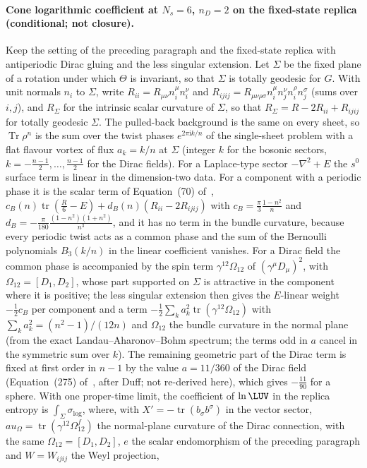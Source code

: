 \paragraph{Cone logarithmic coefficient at \(N_s=6\), \(n_D=2\) on the fixed-state replica (conditional; not closure).}
Keep the setting of the preceding paragraph and the fixed-state replica with antiperiodic Dirac gluing and the less singular extension. Let \(\Sigma\) be the fixed plane of a rotation under which \(\Theta\) is invariant, so that \(\Sigma\) is totally geodesic for \(G\). With unit normals \(n_i\) to \(\Sigma\), write \(R_{ii}=R_{\mu\nu}n^\mu_in^\nu_i\) and \(R_{ijij}=R_{\mu\nu\rho\sigma}n^\mu_in^\nu_jn^\rho_in^\sigma_j\) (sums over \(i,j\)), and \(R_\Sigma\) for the intrinsic scalar curvature of \(\Sigma\), so that \(R_\Sigma=R-2R_{ii}+R_{ijij}\) for totally geodesic \(\Sigma\). The pulled-back background is the same on every sheet, so \(\operatorname{Tr}\rho^n\) is the sum over the twist phases \(e^{2\pi\mathrm ik/n}\) of the single-sheet problem with a flat flavour vortex of flux \(a_k=k/n\) at \(\Sigma\) (integer \(k\) for the bosonic sectors, \(k=-\tfrac{n-1}2,\dots,\tfrac{n-1}2\) for the Dirac fields). For a Laplace-type sector \(-\nabla^2+E\) the \(s^0\) surface term is linear in the dimension-two data. For a component with a periodic phase it is the scalar term of Equation~(70) of~\cite{Solodukhin2011}, \(c_B(n)\operatorname{tr}(\tfrac R6-E)+d_B(n)(R_{ii}-2R_{ijij})\) with \(c_B=\tfrac\pi3\tfrac{1-n^2}n\) and \(d_B=-\tfrac\pi{180}\tfrac{(1-n^2)(1+n^2)}{n^3}\), and it has no term in the bundle curvature, because every periodic twist acts as a common phase and the sum of the Bernoulli polynomials \(B_3(k/n)\) in the linear coefficient vanishes. For a Dirac field the common phase is accompanied by the spin term \(\gamma^{12}\Omega_{12}\) of \((\gamma^\mu D_\mu)^2\), with \(\Omega_{12}=[D_1,D_2]\), whose part supported on \(\Sigma\) is attractive in the component where it is positive; the less singular extension then gives the \(E\)-linear weight \(-\tfrac12c_B\) per component and a term \(-\tfrac12\sum_ka_k^2\operatorname{tr}(\gamma^{12}\Omega_{12})\) with \(\sum_ka_k^2=(n^2-1)/(12n)\) and \(\Omega_{12}\) the bundle curvature in the normal plane (from the exact Landau--Aharonov--Bohm spectrum; the terms odd in \(a\) cancel in the symmetric sum over \(k\)). The remaining geometric part of the Dirac term is fixed at first order in \(n-1\) by the value \(a=11/360\) of the Dirac field (Equation~(275) of~\cite{Solodukhin2011}, after Duff; not re-derived here), which gives \(-\tfrac{11}{90}\) for a sphere. With one proper-time limit, the coefficient of \(\ln\LUV\) in the replica entropy is \(\int_\Sigma\sigma_{\log}\), where, with \(X'=-\operatorname{tr}(b_\sigma b^\sigma)\) in the vector sector, \(	au_\Omega=\operatorname{tr}(\gamma^{12}\Omega^{f}_{12})\) the normal-plane curvature of the Dirac connection, with the same \(\Omega_{12}=[D_1,D_2]\), \(e\) the scalar endomorphism of the preceding paragraph and \(W=W_{ijij}\) the Weyl projection,
